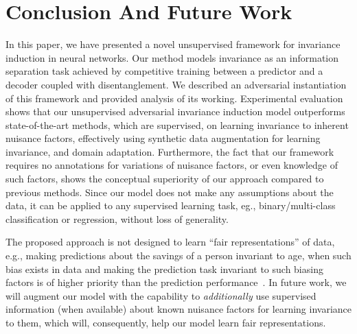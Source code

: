 \section{Conclusion And Future Work}
\label{sec:conclusion}

In this paper, we have presented a novel unsupervised framework for invariance induction in neural networks. Our method models invariance as an information separation task achieved by competitive training between a predictor and a decoder coupled with disentanglement. We described an adversarial instantiation of this framework and provided analysis of its working. Experimental evaluation shows that our unsupervised adversarial invariance induction model outperforms state-of-the-art methods, which are supervised, on learning invariance to inherent nuisance factors, effectively using synthetic data augmentation for learning invariance, and domain adaptation. Furthermore, the fact that our framework requires no annotations for variations of nuisance factors, or even knowledge of such factors, shows the conceptual superiority of our approach compared to previous methods. Since our model does not make any assumptions about the data, it can be applied to any supervised learning task, eg., binary/multi-class classification or regression, without loss of generality.

The proposed approach is not designed to learn ``fair representations'' of data, e.g., making predictions about the savings of a person invariant to age, when such bias exists in data and making the prediction task invariant to such biasing factors is of higher priority than the prediction performance~\cite{bib:sai}. In future work, we will augment our model with the capability to \emph{additionally} use supervised information (when available) about known nuisance factors for learning invariance to them, which will, consequently, help our model learn fair representations.